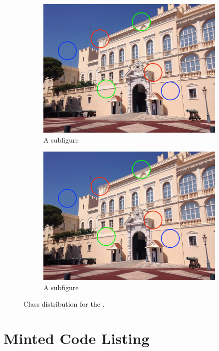 \documentclass[letterpaper,12pt]{article}
\begin{document}
\begin{appendices}
\begin{figure}[h]
\centering
\begin{subfigure}{.5\textwidth}
  \centering
  \includegraphics[width=.9\textwidth]{figures/demo_figure.jpg}
  \caption{A subfigure}
  \label{fig:sub1}
\end{subfigure}%
\begin{subfigure}{.5\textwidth}
  \centering
  \includegraphics[width=.9\textwidth]{figures/demo_figure.jpg}
  \caption{A subfigure}
  \label{fig:sub2}
\end{subfigure}
\caption{\label{fig:sgd_binary_class_distribution}Class distribution for the .}
\end{figure}


\clearpage
\section{Minted Code Listing}
\label{sec:appendix-minted-code}


\end{appendices}
\end{document}
